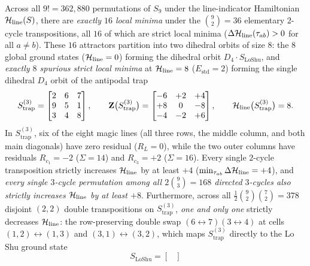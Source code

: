 \begin{theorem}
\label{thm:s9_traps}
Across all $9! = 362{,}880$ permutations of $S_9$ under the line-indicator Hamiltonian $\mathcal{H}_{\mathrm{line}}(S)$, there are \emph{exactly $16$ local minima} under the $\binom{9}{2} = 36$ elementary $2$-cycle transpositions, all $16$ of which are strict local minima ($\Delta\mathcal{H}_{\mathrm{line}}(\tau_{ab}) > 0$ for all $a \ne b$). These $16$ attractors partition into two dihedral orbits of size $8$: the $8$ global ground states ($\mathcal{H}_{\mathrm{line}} = 0$) forming the dihedral orbit $D_4 \cdot S_{\mathrm{LoShu}}$, and \emph{exactly $8$ spurious strict local minima} at $\mathcal{H}_{\mathrm{line}} = 8$ ($E_{\mathrm{std}} = 2$) forming the single dihedral $D_4$ orbit of the antipodal trap
\begin{equation}
  S_{\mathrm{trap}}^{(3)} = \begin{bmatrix}
    2 & 6 & 7 \\
    9 & 5 & 1 \\
    3 & 4 & 8
  \end{bmatrix}, \qquad
  \mathbf{Z}\bigl(S_{\mathrm{trap}}^{(3)}\bigr) = \begin{bmatrix}
    -6 & +2 & +4 \\
    +8 & 0 & -8 \\
    -4 & -2 & +6
  \end{bmatrix}, \qquad \mathcal{H}_{\mathrm{line}}\bigl(S_{\mathrm{trap}}^{(3)}\bigr) = 8.
  \label{eq:S_trap_3}
\end{equation}
In $S_{\mathrm{trap}}^{(3)}$, six of the eight magic lines (all three rows, the middle column, and both main diagonals) have zero residual ($R_L = 0$), while the two outer columns have residuals $R_{c_1} = -2$ ($\Sigma=14$) and $R_{c_3} = +2$ ($\Sigma=16$). Every single $2$-cycle transposition strictly increases $\mathcal{H}_{\mathrm{line}}$ by at least $+4$ ($\min_{\tau_{ab}} \Delta\mathcal{H}_{\mathrm{line}} = +4$), and \emph{every single $3$-cycle permutation among all $2\binom{9}{3} = 168$ directed $3$-cycles also strictly increases $\mathcal{H}_{\mathrm{line}}$ by at least $+8$}. Furthermore, across all $\frac{1}{2}\binom{9}{2}\binom{7}{2} = 378$ disjoint $(2,2)$ double transpositions on $S_{\mathrm{trap}}^{(3)}$, \emph{one and only one} strictly decreases $\mathcal{H}_{\mathrm{line}}$: the row-preserving double swap $(6\leftrightarrow 7)(3\leftrightarrow 4)$ at cells $(1,2)\leftrightarrow(1,3)$ and $(3,1)\leftrightarrow(3,2)$, which maps $S_{\mathrm{trap}}^{(3)}$ directly to the Lo Shu ground state
\begin{equation}
  S_{\mathrm{LoShu}} = \begin{bmatrix}

\end{bmatrix}
\end{equation}
\end{theorem}
